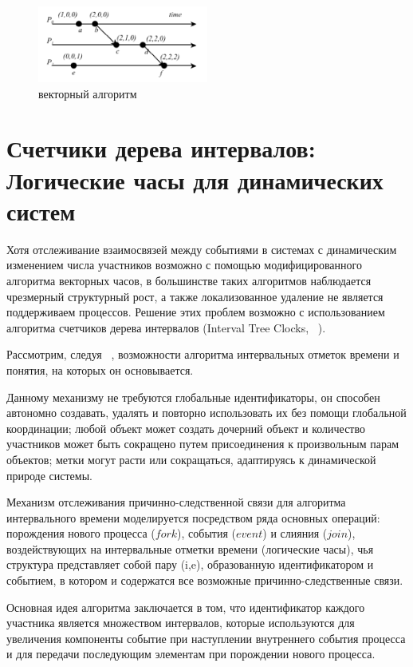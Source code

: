\begin{figure}
\centering
\includegraphics[width=0.5\textwidth]{img/vector.jpg}
\caption{векторный алгоритм}
\end{figure}

\section{Счетчики дерева интервалов: Логические часы для динамических систем}
Хотя отслеживание взаимосвязей между событиями в системах с динамическим изменением числа участников возможно с помощью модифицированного алгоритма векторных часов, в большинстве таких алгоритмов наблюдается чрезмерный структурный рост, а также локализованное удаление не является поддерживаем процессов. Решение этих проблем возможно с использованием алгоритма счетчиков дерева интервалов (Interval Tree Clocks, ~\cite{itc_article}).\par
Рассмотрим, следуя ~\cite{itc_article}, возможности алгоритма интервальных отметок времени и понятия, на которых он основывается.\par
Данному механизму не требуются глобальные идентификаторы, он способен автономно создавать, удалять и повторно использовать их без помощи глобальной координации; любой объект может создать дочерний объект и количество участников может быть сокращено путем присоединения к произвольным парам объектов; метки могут расти или сокращаться, адаптируясь к динамической природе системы.\par
Механизм отслеживания причинно-следственной связи для алгоритма интервального времени моделируется посредством ряда основных операций: порождения нового процесса ($fork$), события ($event$) и слияния ($join$), воздействующих на интервальные отметки времени (логические часы), чья структура представляет собой пару (i,e), образованную идентификатором и событием, в котором и содержатся все возможные причинно-следственные связи.\par
Основная идея алгоритма заключается в том, что идентификатор каждого участника является множеством интервалов, которые используются для увеличения компоненты событие при наступлении внутреннего события процесса и для передачи последующим элементам при порождении нового процесса.\par 
